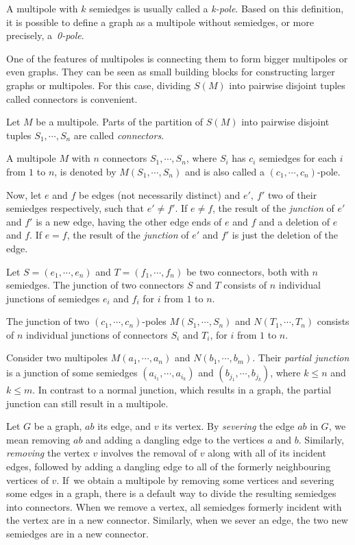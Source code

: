 A multipole with $k$ semiedges is usually called a \textit{k-pole}. Based on this definition, it is possible to define a graph as a multipole without semiedges, or more precisely, a~\textit{0-pole}.

One of the features of multipoles is connecting them to form bigger multipoles or even graphs. They can be seen as small building blocks for constructing larger graphs or multipoles. For this case, dividing $S(M)$ into pairwise disjoint tuples called connectors is convenient.

\begin{definition}
	Let $M$ be a multipole. Parts of the partition of $S(M)$ into pairwise disjoint tuples $S_1,\cdots, S_n$ are called \textit{connectors}.
\end{definition}

A multipole $M$ with $n$ connectors $S_1,\cdots,S_n$, where $S_i$ has $c_i$ semiedges for each $i$ from $1$ to $n$, is denoted by $M(S_1,\cdots,S_n)$ and is also called a $(c_1,\cdots,c_n)$-pole.

Now, let $e$ and $f$ be edges (not necessarily distinct) and $e',~f'$ two of their semiedges respectively, such that $e'\neq f'$. If $e\neq f$, the result of the \textit{junction} of $e'$ and $f'$ is a new edge, having the other edge ends of $e$ and $f$ and a deletion of $e$ and $f$. If $e=f$, the result of the \textit{junction} of $e'$ and $f'$ is just the deletion of the edge.

Let $S=(e_1,\cdots,e_n)$ and $T=(f_1,\cdots,f_n)$ be two connectors, both with $n$ semiedges. The junction of two connectors $S$ and $T$ consists of $n$ individual junctions of semiedges $e_i$ and $f_i$ for $i$ from $1$ to $n$.

The junction of two $(c_1,\cdots,c_n)$-poles $M(S_1,\cdots,S_n)$ and $N(T_1,\cdots,T_n)$ consists of $n$ individual junctions of connectors $S_i$ and $T_i$, for $i$ from $1$ to $n$.

Consider two multipoles $M(a_1,\cdots,a_n)$ and $N(b_1,\cdots,b_m)$. Their \textit{partial junction} is a junction of some semiedges $(a_{i_1},\cdots, a_{i_k})$ and $(b_{j_1},\cdots, b_{j_k})$, where $k\leq n$ and $k\leq m$. In contrast to a normal junction, which results in a graph, the partial junction can still result in a multipole.

Let $G$ be a graph, $ab$ its edge, and $v$ its vertex. By \textit{severing} the edge $ab$ in $G$, we mean removing $ab$ and adding a dangling edge to the vertices $a$ and $b$. Similarly, \textit{removing} the vertex $v$ involves the removal of $v$ along with all of its incident edges, followed by adding a dangling edge to all of the formerly neighbouring vertices of $v$. If~we obtain a multipole by removing some vertices and severing some edges in a graph, there is a default way to divide the resulting semiedges into connectors. When we remove a vertex, all semiedges formerly incident with the vertex are in a new connector. Similarly, when we sever an edge, the two new semiedges are in a new connector.

